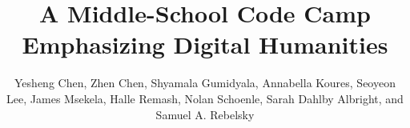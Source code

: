 \documentclass[sigconf]{acmart}
\begin{document}
\title{A Middle-School Code Camp Emphasizing Digital Humanities}

\author{Yesheng Chen, Zhen Chen, Shyamala Gumidyala, Annabella Koures, Seoyeon Lee, James Msekela, Halle Remash, Nolan Schoenle, Sarah Dahlby Albright, and Samuel A. Rebelsky}

\renewcommand{\shortauthors}{Chen \textit{et al.}}





\maketitle

\newcommand{\college}{Grinnell}






\balance
 
\end{document}
